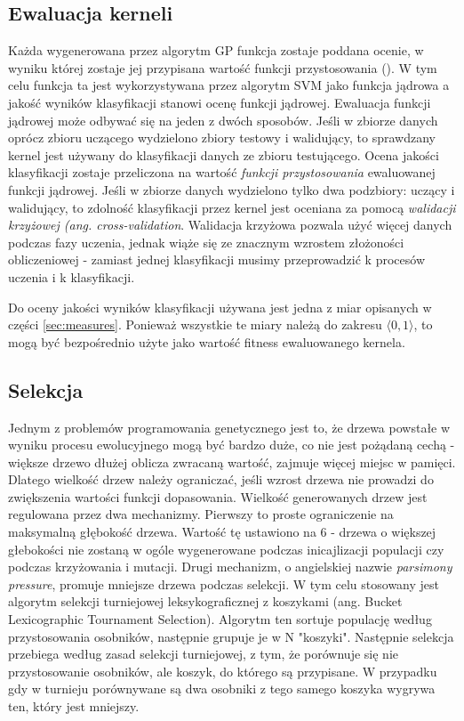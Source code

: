 \subsection{Ewaluacja kerneli}\label{sec:ewaluacja}
Każda wygenerowana przez algorytm GP funkcja zostaje poddana ocenie, w wyniku której zostaje jej przypisana wartość funkcji przystosowania (). W tym celu funkcja ta jest wykorzystywana przez algorytm SVM jako funkcja jądrowa a jakość wyników klasyfikacji stanowi ocenę funkcji jądrowej.
Ewaluacja funkcji jądrowej może odbywać się na jeden z dwóch sposobów. Jeśli w zbiorze danych oprócz zbioru uczącego wydzielono zbiory testowy i walidujący, to sprawdzany kernel jest używany do klasyfikacji danych ze zbioru testującego. Ocena jakości klasyfikacji zostaje przeliczona na wartość \textit{ funkcji przystosowania} ewaluowanej funkcji jądrowej.
Jeśli w zbiorze danych wydzielono tylko dwa podzbiory: uczący i walidujący, to zdolność klasyfikacji przez kernel jest oceniana za pomocą \textit{walidacji krzyżowej (ang. cross-validation}.
Walidacja krzyżowa pozwala użyć więcej danych podczas fazy uczenia, jednak wiąże się ze znacznym wzrostem złożoności obliczeniowej - zamiast jednej klasyfikacji musimy przeprowadzić k procesów uczenia i k klasyfikacji.

Do oceny jakości wyników klasyfikacji używana jest jedna z miar opisanych w części \ref{sec:measures}. Ponieważ wszystkie te miary należą do zakresu $ \langle 0,1 \rangle $, to mogą być bezpośrednio użyte jako wartość fitness ewaluowanego kernela.

\subsection{Selekcja}
Jednym z problemów programowania genetycznego jest to, że drzewa powstałe w wyniku procesu ewolucyjnego mogą być bardzo duże, co nie jest pożądaną cechą - większe drzewo dłużej oblicza zwracaną wartość, zajmuje więcej miejsc w pamięci. Dlatego wielkość drzew należy ograniczać, jeśli wzrost drzewa nie prowadzi do zwiększenia wartości funkcji dopasowania.
Wielkość generowanych drzew jest regulowana przez dwa mechanizmy. Pierwszy to proste ograniczenie na maksymalną głębokość drzewa. Wartość tę ustawiono na 6 - drzewa o większej głebokości nie zostaną w ogóle wygenerowane podczas inicajlizacji populacji czy podczas krzyżowania i mutacji. Drugi mechanizm, o angielskiej nazwie \textit{parsimony pressure},  promuje mniejsze drzewa podczas selekcji. W tym celu stosowany jest algorytm selekcji turniejowej leksykograficznej z koszykami (ang. Bucket Lexicographic
 Tournament Selection). Algorytm ten sortuje populację według przystosowania osobników, następnie grupuje je w N "koszyki". Następnie selekcja przebiega według zasad selekcji turniejowej, z tym, że porównuje się nie przystosowanie osobników, ale koszyk, do którego są przypisane. W przypadku gdy w turnieju porównywane są dwa osobniki z tego samego koszyka wygrywa ten, który jest mniejszy.

